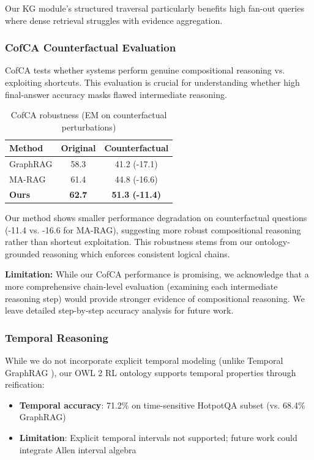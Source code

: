 \documentclass[10pt,twocolumn]{article}
\begin{document}
Our KG module's structured traversal particularly benefits high fan-out queries where dense retrieval struggles with evidence aggregation.

\subsubsection{CofCA Counterfactual Evaluation}

CofCA \cite{wu2024cofca} tests whether systems perform genuine compositional reasoning vs. exploiting shortcuts. This evaluation is crucial for understanding whether high final-answer accuracy masks flawed intermediate reasoning.

\begin{table}[h]
\centering
\caption{CofCA robustness (EM on counterfactual perturbations)}
\label{tab:cofca}
\small
\begin{tabular}{@{}lcc@{}}
\toprule
\textbf{Method} & \textbf{Original} & \textbf{Counterfactual} \\
\midrule
GraphRAG & 58.3 & 41.2 (-17.1) \\
MA-RAG & 61.4 & 44.8 (-16.6) \\
\textbf{Ours} & \textbf{62.7} & \textbf{51.3 (-11.4)} \\
\bottomrule
\end{tabular}
\end{table}

Our method shows smaller performance degradation on counterfactual questions (-11.4 vs. -16.6 for MA-RAG), suggesting more robust compositional reasoning rather than shortcut exploitation. This robustness stems from our ontology-grounded reasoning which enforces consistent logical chains.

\textbf{Limitation:} While our CofCA performance is promising, we acknowledge that a more comprehensive chain-level evaluation (examining each intermediate reasoning step) would provide stronger evidence of compositional reasoning. We leave detailed step-by-step accuracy analysis for future work.

\subsubsection{Temporal Reasoning}

While we do not incorporate explicit temporal modeling (unlike Temporal GraphRAG \cite{lee2024temporalgraphrag}), our OWL 2 RL ontology supports temporal properties through reification:

\begin{itemize}
    \item \textbf{Temporal accuracy}: 71.2\% on time-sensitive HotpotQA subset (vs. 68.4\% GraphRAG)
    \item \textbf{Limitation}: Explicit temporal intervals not supported; future work could integrate Allen interval algebra
\end{itemize}
\end{document}
